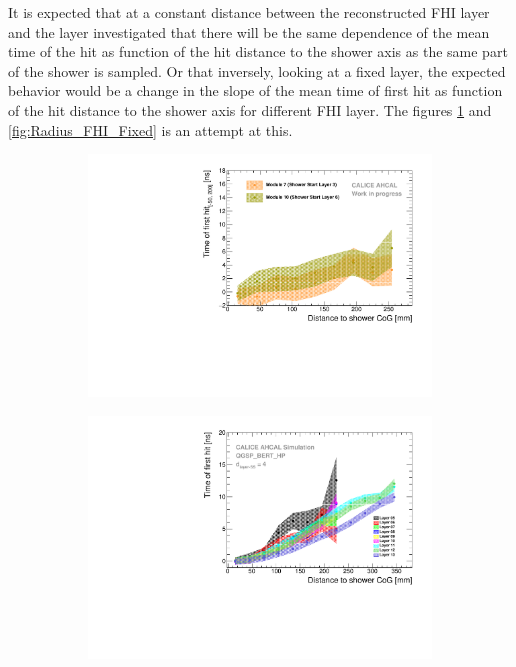 It is expected that at a constant distance between the reconstructed FHI layer and the layer investigated that there will be the same dependence of the mean time of the hit as function of the hit distance to the shower axis as the same part of the shower is sampled. Or that inversely, looking at a fixed layer, the expected behavior would be a change in the slope of the mean time of first hit as function of the hit distance to the shower axis for different FHI layer. The figures \ref{fig:Radius_FHI} and \ref{fig:Radius_FHI_Fixed} is an attempt at this.

\begin{figure}[htbp!]
	\begin{subfigure}[t]{0.5\textwidth}
		\centering
		\includegraphics[width=1\textwidth]{../Thesis_Plots/Timing/Pions/Plots/Timing_Radius_Comparison_ShortAsymRange_ShowerStart.pdf}
		\caption{}\label{fig:Radius_FHI}
	\end{subfigure}
	\hfill
	\begin{subfigure}[t]{0.5\textwidth}
		\centering
		\includegraphics[width=1\textwidth]{../Thesis_Plots/Timing/Pions/Plots/Radius_ShowerStartTruth.pdf}

\end{subfigure}
\end{figure}
